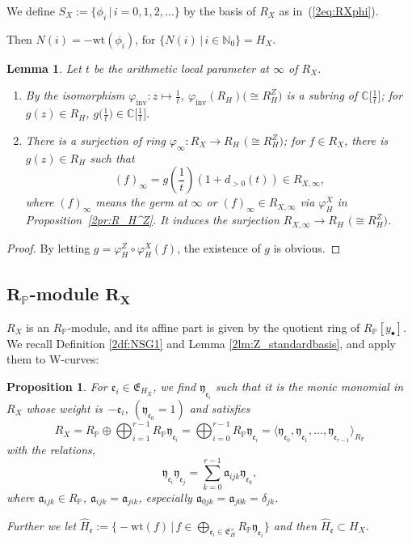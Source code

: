 \documentclass[pdftex]{sigma}
\def\CC{{\mathbb C}}
\def\NN{{\mathbb N}}
\def\PP{{\mathbb P}}
\def\fE{{\mathfrak E}}
\def\fa{{\mathfrak a}}
\def\fe{{\mathfrak e}}
\def\fy{{\mathfrak y}}
\def\hH{{\widehat H}}
\def\wt{{\mathrm {wt}}}
\numberwithin{equation}{section}
\newtheorem{Lemma}[Theorem]{Lemma}
\newtheorem{Proposition}[Theorem]{Proposition}
 { \theoremstyle{definition}
\newtheorem{Definition}[Theorem]{Definition}
\newtheorem{Note}[Theorem]{Note}
\newtheorem{Example}[Theorem]{Example}
\newtheorem{Remark}[Theorem]{Remark} }
\begin{document}
\begin{Definition}\label{2df:t_SR_N}
We define $S_X:=\{\phi_i\, |\,i = 0,1,2, \dots\}$ by the basis of $R_X$ as in~(\ref{2eq:RXphi}).
\end{Definition}

Then $N(i)=-\wt(\phi_i)$, for $\{N(i)\, |\,i \in \NN_0\}=H_X$.

\begin{Lemma}\label{2lm:varphiinf}
Let $t$ be the arithmetic local parameter at $\infty$ of $R_X$.
\begin{enumerate}\itemsep=0pt
\item[$1.$] By the isomorphism $\varphi_{\mathrm{inv}}\colon z \mapsto \frac{1}{t}$, $\varphi_{\mathrm{inv}}(R_H)\big({\cong} R_H^Z\big)$ is a subring of $\CC\big[\frac{1}{t}\big]$; for $g(z)\in R_H$, $g\big(\frac{1}{t}\big)\in \CC\big[\frac{1}{t}\big]$.

\item[$2.$] There is a surjection of ring $\varphi_\infty\colon R_{X}\to R_H$ $\big({\cong} R_H^Z\big)$; for $f\in R_X$, there is $g(z)\in R_H$ such that
\[
 (f)_\infty = g
\left(\frac{1}{t}\right)(1+d_{>0}(t)) \in R_{X,\infty},
\]
where $(f)_\infty$ means the germ at $\infty$ or $(f)_\infty \in R_{X, \infty}$ via $\varphi_H^X$ in Proposition~{\rm \ref{2pr:R_H^Z}}.
It induces the surjection $R_{X,\infty}\to R_H$ $\big({\cong} R_H^Z\big)$.
\end{enumerate}
\end{Lemma}
\begin{proof}By letting $g=\varphi_H^Z \circ\varphi_H^X(f)$, the existence of $g$ is obvious.
\end{proof}

\subsection[R\_P-module R\_X]{$\boldsymbol{R_\PP}$-module $\boldsymbol{R_X}$}\label{2ssc:R_Pmodule_R_X}

$R_X$ is an $R_\PP$-module, and its affine part is given by the quotient ring of $R_\PP[y_{\bullet}]$.
We recall Definition \ref{2df:NSG1} and Lemma \ref{2lm:Z_standardbasis}, and apply them to W-curves:

\begin{Proposition}\label{2pr:RP-moduleRX}
For $\fe_i \in \fE_{H_X}$, we find $\fy_{\fe_i}$ such that it is the monic monomial in $R_X$ whose weight is~$-\fe_i$, $(\fy_{\fe_0}=1)$ and satisfies
\[
R_X = R_\PP \oplus \bigoplus_{i=1}^{r-1} R_\PP \fy_{\fe_i}
=\bigoplus_{i=0}^{r-1} R_\PP \fy_{\fe_i}
=\langle \fy_{\fe_0}, \fy_{\fe_1}, \dots, \fy_{\fe_{r-1}}\rangle_{R_\PP}
\]
with the relations,
\begin{equation}
\fy_{\fe_i} \fy_{\fe_j} =\sum_{k=0}^{r-1} \fa_{i j k} \fy_{\fe_k},
\label{2eq:fyfy=fy}
\end{equation}
where $\fa_{i j k} \in R_\PP$, $\fa_{i j k}=\fa_{j i k}$, especially $\fa_{0j k}=\fa_{j0k}=\delta_{j k}$.

Further we let $\hH_{\fe}:=\big\{{-}\wt(f)\, | \, f \in \bigoplus_{\fe_i \in \fE_H^\times} R_\PP \fy_{\fe_i}\big\}$ and then $\hH_{\fe}\subset H_X$.
\end{Proposition}
\end{document}
